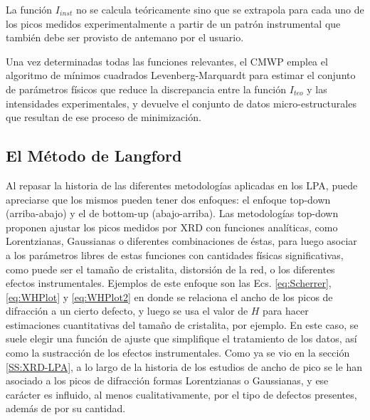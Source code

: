 La función $I_{inst}$ no se calcula teóricamente sino que se extrapola para cada uno de los picos medidos experimentalmente a partir de un patrón instrumental que también debe ser provisto de antemano por el usuario.

Una vez determinadas todas las funciones relevantes, el CMWP emplea el algoritmo de mínimos cuadrados Levenberg-Marquardt para estimar el conjunto de parámetros físicos que reduce la discrepancia entre la función $I_{teo}$ y las intensidades experimentales, y devuelve el conjunto de datos micro-estructurales que resultan de ese proceso de minimización.

\subsection{El Método de Langford}\label{SS:Langford}
Al repasar la historia de las diferentes metodologías aplicadas en los LPA, puede apreciarse que los mismos pueden tener dos enfoques: el enfoque top-down (arriba-abajo) y el de bottom-up (abajo-arriba).
Las metodologías top-down proponen ajustar los picos medidos por XRD con funciones analíticas, como Lorentzianas, Gaussianas o diferentes combinaciones de éstas, para luego asociar a los parámetros libres de estas funciones con cantidades físicas significativas, como puede ser el tamaño de cristalita, distorsión de la red, o los diferentes efectos instrumentales.
Ejemplos de este enfoque son las Ecs. \ref{eq:Scherrer}, \ref{eq:WHPlot} y \ref{eq:WHPlot2} en donde se relaciona el ancho de los picos de difracción a un cierto defecto, y luego se usa el valor de $H$ para hacer estimaciones cuantitativas del tamaño de cristalita, por ejemplo.
En este caso, se suele elegir una función de ajuste que simplifique el tratamiento de los datos, así como la sustracción de los efectos instrumentales.
Como ya se vio en la sección \ref{SS:XRD-LPA}, a lo largo de la historia de los estudios de ancho de pico se le han asociado a los picos de difracción formas Lorentzianas o Gaussianas, y ese carácter es influido, al menos cualitativamente, por el tipo de defectos presentes, además de por su cantidad.

